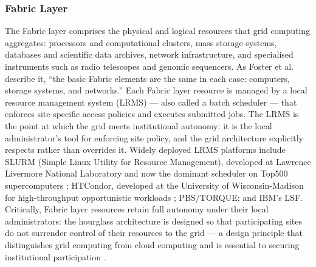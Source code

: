 \documentclass[12pt,a4paper]{report}
\begin{document}
\subsubsection{Fabric Layer}
    The Fabric layer comprises the physical and logical resources that grid computing aggregates: processors and computational clusters,
     mass storage systems, databases and scientific data archives, network infrastructure, and specialised instruments such as radio telescopes
      and genomic sequencers. As Foster et al. \parencite{foster2001} describe it, “the basic Fabric elements are the same in each case: computers, storage 
      systems, and networks.” Each Fabric layer resource is managed by a local resource management system (LRMS) — also called a batch
       scheduler — that enforces site-specific access policies and executes submitted jobs. The LRMS is the point at which the grid meets
        institutional autonomy: it is the local administrator’s tool for enforcing site policy, and the grid architecture explicitly 
        respects rather than overrides it. Widely deployed LRMS platforms include SLURM (Simple Linux Utility for Resource Management), 
        developed at Lawrence Livermore National Laboratory and now the dominant scheduler on Top500 supercomputers \parencite{slurm2003}; 
        HTCondor, developed at the University of Wisconsin-Madison for high-throughput opportunistic workloads \parencite{condor2005};
         PBS/TORQUE; and IBM’s LSF. Critically, Fabric layer resources retain full autonomy under their local administrators: the hourglass 
         architecture is designed so that participating sites do not surrender control of their resources to the grid — a design principle that
          distinguishes grid computing from cloud computing and is essential to securing institutional participation \parencite{foster2001}.
\end{document}
